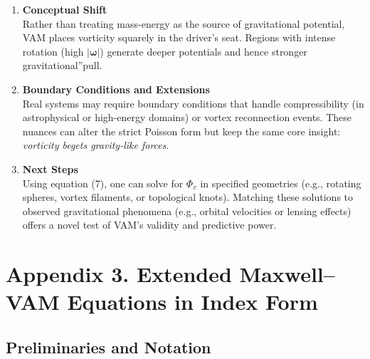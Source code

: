 \documentclass[a4paper,12pt]{article}
\begin{document}
\begin{enumerate}
    \item \textbf{Conceptual Shift} \\
    Rather than treating mass-energy as the source of gravitational potential, VAM places vorticity squarely in the driver's seat. Regions with intense rotation (high \(|\boldsymbol{\omega}|\)) generate deeper potentials and hence stronger \grqq gravitational\textquotedblright pull.
    \item \textbf{Boundary Conditions and Extensions} \\
    Real systems may require boundary conditions that handle compressibility (in astrophysical or high-energy domains) or vortex reconnection events. These nuances can alter the strict Poisson form but keep the same core insight: \textit{vorticity begets gravity-like forces}.
    \item \textbf{Next Steps} \\
    Using equation (7), one can solve for \(\Phi_v\) in specified geometries (e.g., rotating spheres, vortex filaments, or topological knots). Matching these solutions to observed gravitational phenomena (e.g., orbital velocities or lensing effects) offers a novel test of VAM's validity and predictive power.
\end{enumerate}
\label{appendix:2}

\section{Appendix 3. Extended Maxwell--VAM Equations in Index Form}

\subsection{Preliminaries and Notation}
\end{document}
